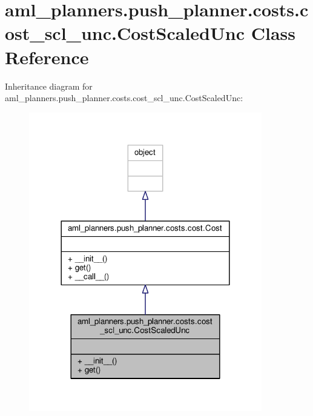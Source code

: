 \hypertarget{classaml__planners_1_1push__planner_1_1costs_1_1cost__scl__unc_1_1_cost_scaled_unc}{\section{aml\-\_\-planners.\-push\-\_\-planner.\-costs.\-cost\-\_\-scl\-\_\-unc.\-Cost\-Scaled\-Unc Class Reference}
\label{classaml__planners_1_1push__planner_1_1costs_1_1cost__scl__unc_1_1_cost_scaled_unc}
}


Inheritance diagram for aml\-\_\-planners.\-push\-\_\-planner.\-costs.\-cost\-\_\-scl\-\_\-unc.\-Cost\-Scaled\-Unc\-:
\nopagebreak
\begin{figure}[H]
\begin{center}
\leavevmode
\includegraphics[width=288pt]{classaml__planners_1_1push__planner_1_1costs_1_1cost__scl__unc_1_1_cost_scaled_unc__inherit__graph}
\end{center}
\end{figure}



